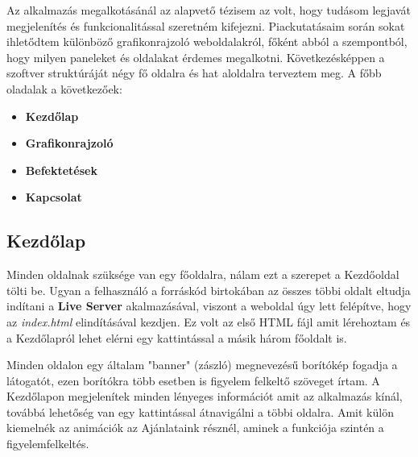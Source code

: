 Az alkalmazás megalkotásánál az alapvető tézisem az volt, hogy tudásom legjavát  megjelenítés és funkcionalitással szeretném kifejezni. Piackutatásaim során sokat ihletődtem különböző grafikonrajzoló weboldalakról, főként abból a szempontból, hogy milyen paneleket és oldalakat érdemes megalkotni. Következésképpen a szoftver struktúráját négy fő oldalra és hat aloldalra terveztem meg.\cite{Aegon} A főbb oladalak a következőek: 

\begin{itemize}
\item \textbf{Kezdőlap}
\item \textbf{Grafikonrajzoló}
\item \textbf{Befektetések}
\item \textbf{Kapcsolat}
\end{itemize}

\subsection{Kezdőlap}

Minden oldalnak szüksége van egy főoldalra, nálam ezt a szerepet a Kezdőoldal tölti be. Ugyan a felhasználó a forráskód birtokában az összes többi oldalt eltudja indítani a \textbf{Live Server} akalmazásával, viszont a weboldal úgy lett felépítve, hogy az \emph{index.html} elindításával kezdjen. Ez volt az első HTML fájl amit lérehoztam és a Kezdőlapról lehet elérni egy kattintással a másik három főoldalt is.

	Minden oldalon egy általam "banner" (zászló) megnevezésű borítókép fogadja a látogatót, ezen borítókra több esetben is figyelem felkeltő szöveget írtam. A Kezdőlapon megjelenítek minden lényeges információt amit az alkalmazás kínál, továbbá lehetőség van egy kattintással átnavigálni a többi oldalra. Amit külön kiemelnék az animációk az Ajánlataink résznél, aminek a funkciója szintén a figyelemfelkeltés.

